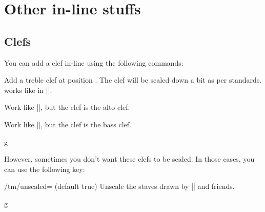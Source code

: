 \section{Other in-line stuffs}\label{sec:inline}
\subsection{Clefs}\label{sec:inline:clef}
You can add a clef in-line using the following commands:
\begin{command}{\tmgclef{}}
  Add a treble clef at position . The clef will be scaled down a bit 
  as per standards.  works like in |\tmkeysignature|.
\end{command}
\begin{command}{\tmcclef{}}
  Work like |\tmgclef|, but the clef is the alto clef.
\end{command}
\begin{command}{\tmfclef{}}
  Work like |\tmgclef|, but the clef is the bass clef.
\end{command}
\begin{codeexample}[]
\begin{tmline}
\begin{tmstaff}{g}{}
\end{tmstaff}
\end{tmline}
\end{codeexample}
However, sometimes you don't want these clefs to be scaled. In those cases, you 
can use the following key:
\begin{key}{/tm/unscaled= (default true)}
  Unscale the staves drawn by |\tmgclef| and friends.
\end{key}
\begin{codeexample}[]
\begin{tmline}
\begin{tmstaff}[unscaled]{g}{}
\end{tmstaff}%
\end{tmline}
\end{codeexample}
